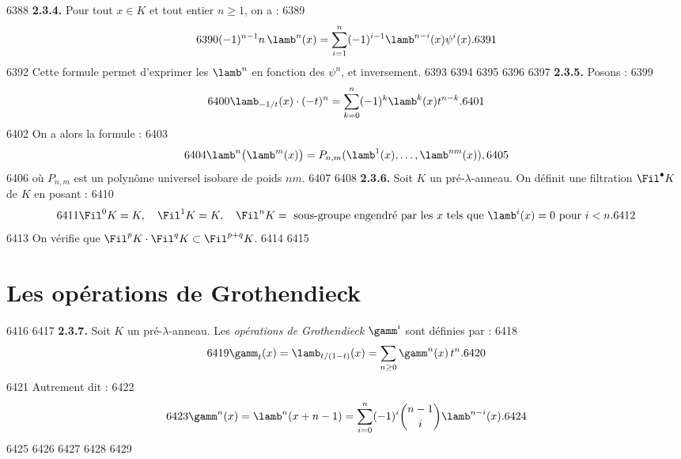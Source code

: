   6388	\noindent\textbf{2.3.4.} Pour tout $x \in K$ et tout entier $n \geq 1$, on a :
  6389	\begin{equation}
  6390	(-1)^{n-1} n \, \lamb^n(x) = \sum_{i=1}^{n} (-1)^{i-1} \lamb^{n-i}(x) \psi^i(x).
  6391	\end{equation}
  6392	Cette formule permet d'exprimer les $\lamb^n$ en fonction des $\psi^n$, et inversement.
  6393	
  6394	%
  6395	%
  6396	%
  6397		\noindent\textbf{2.3.5.} Posons :
  6399	\begin{equation}
  6400	\lamb_{-1/t}(x) \cdot (-t)^n = \sum_{k=0}^{n} (-1)^k \lamb^k(x) t^{n-k}.
  6401	\end{equation}
  6402	On a alors la formule :
  6403	\begin{equation}
  6404	\lamb^n\bigl(\lamb^m(x)\bigr) = P_{n,m}(\lamb^1(x), \ldots, \lamb^{nm}(x)),
  6405	\end{equation}
  6406	o\`u $P_{n,m}$ est un polyn\^ome universel isobare de poids $nm$.
  6407	
  6408		\noindent\textbf{2.3.6.} Soit $K$ un pr\'e-$\lambda$-anneau. On d\'efinit une filtration $\Fil^\bullet K$ de $K$ en posant :
  6410	\begin{equation}
  6411	\Fil^0 K = K, \quad \Fil^1 K = K, \quad \Fil^n K = \text{ sous-groupe engendr\'e par les } x \text{ tels que } \lamb^i(x) = 0 \text{ pour } i < n.
  6412	\end{equation}
  6413	On v\'erifie que $\Fil^p K \cdot \Fil^q K \subset \Fil^{p+q} K$.
  6414	
  6415	\section{Les op\'erations de Grothendieck}
  6416	
  6417	\noindent\textbf{2.3.7.} Soit $K$ un pr\'e-$\lambda$-anneau. Les \emph{op\'erations de Grothendieck} $\gamm^i$ sont d\'efinies par :
  6418	\begin{equation}
  6419	\gamm_t(x) = \lamb_{t/(1-t)}(x) = \sum_{n \geq 0} \gamm^n(x) \, t^n.
  6420	\end{equation}
  6421	Autrement dit :
  6422	\begin{equation}
  6423	\gamm^n(x) = \lamb^n(x + n - 1) = \sum_{i=0}^{n} (-1)^i \binom{n-1}{i} \lamb^{n-i}(x).
  6424	\end{equation}
  6425	
  6426	%
  6427	%
  6428	%
  6429	\smallskip
